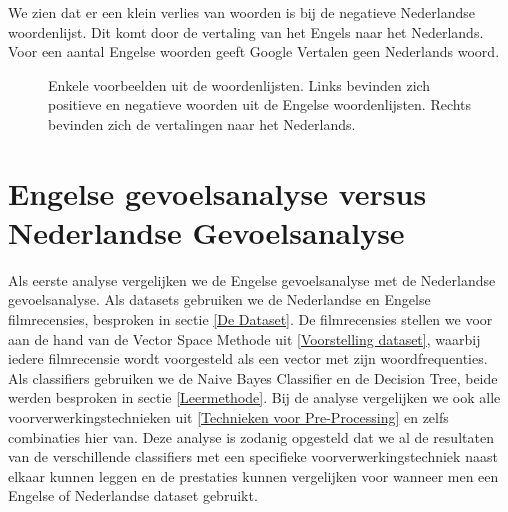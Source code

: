 We zien dat er een klein verlies van woorden is bij de negatieve Nederlandse woordenlijst. Dit komt door de vertaling van het Engels naar het Nederlands. Voor een aantal Engelse woorden geeft Google Vertalen geen Nederlands woord. 

\begin{figure}%
    \centering
    \caption{Enkele voorbeelden uit de woordenlijsten. Links bevinden zich positieve en negatieve woorden uit de Engelse woordenlijsten. Rechts bevinden zich de vertalingen naar het Nederlands.}
    \label{vbwoordenlijsten}
\end{figure}

\section{Engelse gevoelsanalyse versus Nederlandse Gevoelsanalyse}\label{Engelse gevoelsanalyse versus Nederlandse Gevoelsanalyse}

Als eerste analyse vergelijken we de Engelse gevoelsanalyse met de Nederlandse gevoelsanalyse. Als datasets gebruiken we de Nederlandse en Engelse filmrecensies, besproken in sectie \ref{De Dataset}. De filmrecensies stellen we voor aan de hand van de Vector Space Methode uit \ref{Voorstelling dataset}, waarbij iedere filmrecensie wordt voorgesteld als een vector met zijn woordfrequenties. Als classifiers gebruiken we de Naive Bayes Classifier en de Decision Tree, beide werden besproken in sectie \ref{Leermethode}. Bij de analyse vergelijken we ook alle voorverwerkingstechnieken uit \ref{Technieken voor Pre-Processing} en zelfs combinaties hier van. Deze analyse is zodanig opgesteld dat we al de resultaten van de verschillende classifiers met een specifieke voorverwerkingstechniek naast elkaar kunnen leggen en de prestaties kunnen vergelijken voor wanneer men een Engelse of Nederlandse dataset gebruikt.\\


